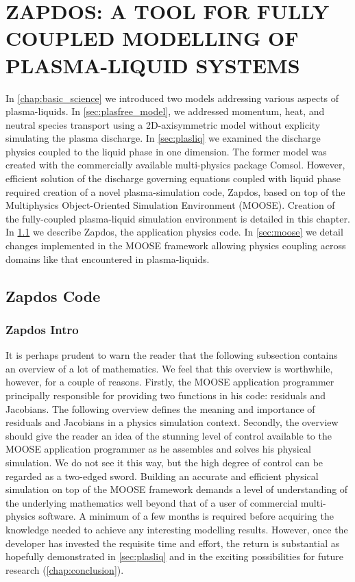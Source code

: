 \chapter{ZAPDOS: A TOOL FOR FULLY COUPLED MODELLING OF PLASMA-LIQUID SYSTEMS}
\label{chap:zapdos}

In \cref{chap:basic_science} we introduced two models addressing various aspects of plasma-liquids. In \cref{sec:plasfree_model}, we addressed momentum, heat, and neutral species transport using a 2D-axisymmetric model without explicity simulating the plasma discharge. In \cref{sec:plasliq} we examined the discharge physics coupled to the liquid phase in one dimension. The former model was created with the commercially available multi-physics package Comsol. However, efficient solution of the discharge governing equations coupled with liquid phase required creation of a novel plasma-simulation code, Zapdos, based on top of the Multiphysics Object-Oriented Simulation Environment (MOOSE). Creation of the fully-coupled plasma-liquid simulation environment is detailed in this chapter. In \cref{sec:zapdos} we describe Zapdos, the application physics code. In \cref{sec:moose} we detail changes implemented in the MOOSE framework allowing physics coupling across domains like that encountered in plasma-liquids.

\section{Zapdos Code}
\label{sec:zapdos}

\subsection{Zapdos Intro}
\label{sec:zapdos_intro}

It is perhaps prudent to warn the reader that the following subsection contains an overview of a lot of mathematics. We feel that this overview is worthwhile, however, for a couple of reasons. Firstly, the MOOSE application programmer principally responsible for providing two functions in his code: residuals and Jacobians. The following overview defines the meaning and importance of residuals and Jacobians in a physics simulation context. Secondly, the overview should give the reader an idea of the stunning level of control available to the MOOSE application programmer as he assembles and solves his physical simulation. We do not see it this way, but the high degree of control can be regarded as a two-edged sword. Building an accurate and efficient physical simulation on top of the MOOSE framework demands a level of understanding of the underlying mathematics well beyond that of a user of commercial multi-physics software. A minimum of a few months is required before acquiring the knowledge needed to achieve any interesting modelling results. However, once the developer has invested the requisite time and effort, the return is substantial as hopefully demonstrated in \cref{sec:plasliq} and in the exciting possibilities for future research (\cref{chap:conclusion}).

